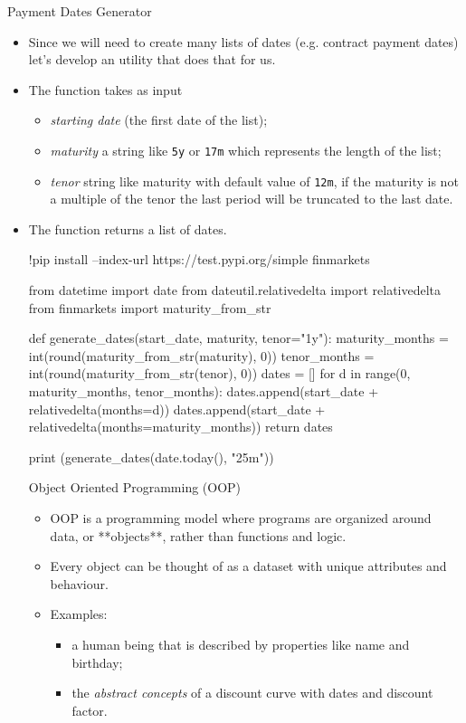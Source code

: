 \documentclass{beamer}
\begin{document}
\begin{frame}[fragile]{Payment Dates Generator}
  \begin{itemize}
    \item Since we will need to create many lists of dates (e.g. contract payment dates) let's develop an utility that does that for us.
    \item The function takes as input
      \begin{itemize}
        \item \emph{starting date} (the first date of the list);
        \item \emph{maturity} a string like \texttt{5y} or \texttt{17m} which represents the length of the list;
        \item \emph{tenor} string like maturity with default value of \texttt{12m}, if the maturity is not a multiple of the tenor the last period will be truncated to the last date.
      \end{itemize}
    \item The function returns a list of dates.
\begin{ipython}
!pip install --index-url https://test.pypi.org/simple finmarkets
\end{ipython}

\begin{ipython}
from datetime import date
from dateutil.relativedelta import relativedelta
from finmarkets import maturity_from_str

def generate_dates(start_date, maturity, tenor="1y"):
  maturity_months = int(round(maturity_from_str(maturity), 0))
  tenor_months = int(round(maturity_from_str(tenor), 0))
  dates = []
  for d in range(0, maturity_months, tenor_months):
    dates.append(start_date + relativedelta(months=d))
  dates.append(start_date + relativedelta(months=maturity_months))
  return dates

print (generate_dates(date.today(), "25m"))
\end{ipython}
\begin{ioutput}
\end{ioutput}

\begin{frame}{Object Oriented Programming (OOP)}
  \begin{itemize}
  \item OOP is a programming model where programs are organized around data, or **objects**, rather than functions and logic.
  \item Every object can be thought of as a dataset with unique attributes and behaviour.
  \item Examples:
    \begin{itemize}
    \item a human being that is described by properties like name and birthday;
    \item the \emph{abstract concepts} of a discount curve with dates and discount factor.
    \end{itemize}
  \end{itemize}
\end{frame}


\end{itemize}
\end{frame}
\end{document}
